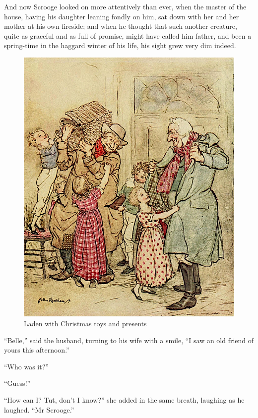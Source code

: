 \documentclass[paper=5.5in:8.5in,BCOR=5mm,twoside,DIV=calc,12pt,usegeometry]{scrbook} %
\begin{document}
And now Scrooge looked on more attentively than ever, when the master of the house, having his daughter leaning fondly on him, sat down with her and her mother at his own fireside; and when he thought that such another creature, quite as graceful and as full of promise, might have called him father, and been a spring-time in the haggard winter of his life, his sight grew very dim indeed.

\begin{figure}[p]
\begin{minipage}[c]{\linewidth}
\includegraphics[width=\linewidth]{prezziesimproved}
\caption*{Laden with Christmas toys and presents}
\end{minipage}
\end{figure}

\enquote{Belle,} said the husband, turning to his wife with a smile, \enquote{I saw an old friend of yours this afternoon.}

\enquote{Who was it?}

\enquote{Guess!}

\enquote{How can I? Tut, don't I know?} she added in the same breath, laughing as he laughed. \enquote{Mr Scrooge.}
\end{document}
